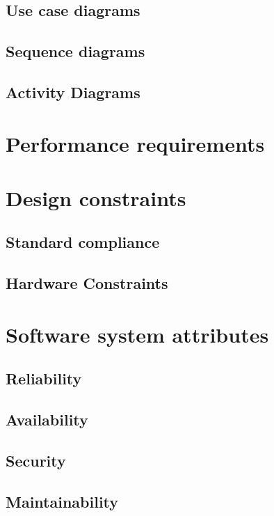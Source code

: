\documentclass[11pt]{report}
\begin{document}
\subsection{Use case diagrams} 

\subsection{Sequence diagrams} 

\subsection{Activity Diagrams}

\section{Performance requirements}

\section{Design constraints}

\subsection{Standard compliance}

\subsection{Hardware Constraints}

\section{Software system attributes}

\subsection{Reliability}

\subsection{Availability}

\subsection{Security}

\subsection{Maintainability}
\end{document}
